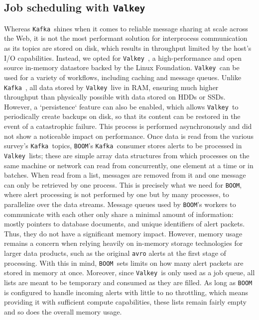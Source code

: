 \documentclass[twocolumn]{aastex631}
\newcommand{\boom}{\texttt{BOOM }}
\newcommand{\kafka}{\texttt{Kafka }}
\newcommand{\valkey}{\texttt{Valkey }}
\begin{document}
\subsection{Job scheduling with \valkey}

Whereas \kafka shines when it comes to reliable message sharing at scale across the Web, it is not the most performant solution for interprocess communication as its topics are stored on disk, which results in throughput limited by the host's I/O capabilities.
Instead, we opted for \valkey, a high-performance and open source in-memory datastore backed by the Linux Foundation.
\valkey can be used for a variety of workflows, including caching and message queues.
Unlike \kafka, all data stored by \valkey live in RAM, ensuring much higher throughput than physically possible with data stored on HDDs or SSDs. However, a `persistence` feature can also be enabled, which allows \valkey to periodically create backups on disk, so that its content can be restored in the event of a catastrophic failure. This process is performed asynchronously and did not show a noticeable impact on performance.
Once data is read from the various survey's \kafka topics, \texttt{BOOM}'s \kafka consumer stores alerts to be processed in \valkey lists; these are simple array data structures from which processes on the same machine or network can read from concurrently, one element at a time or in batches. When read from a list, messages are removed from it and one message can only be retrieved by one process. This is precisely what we need for \texttt{BOOM}, where alert processing is not performed by one but by many processes, to parallelize over the data streams. Message queues used by \texttt{BOOM}'s workers to communicate with each other only share a minimal amount of information: mostly pointers to database documents, and unique identifiers of alert packets. Thus, they do not have a significant memory impact. However, memory usage remains a concern when relying heavily on in-memory storage technologies for larger data products, such as the original \texttt{avro} alerts at the first stage of processing. With this in mind, \boom sets limits on how many alert packets are stored in memory at once. Moreover, since \valkey is only used as a job queue, all lists are meant to be temporary and consumed as they are filled. As long as \boom is configured to handle incoming alerts with little to no throttling, which means providing it with sufficient compute capabilities, these lists remain fairly empty and so does the overall memory usage.
\end{document}
